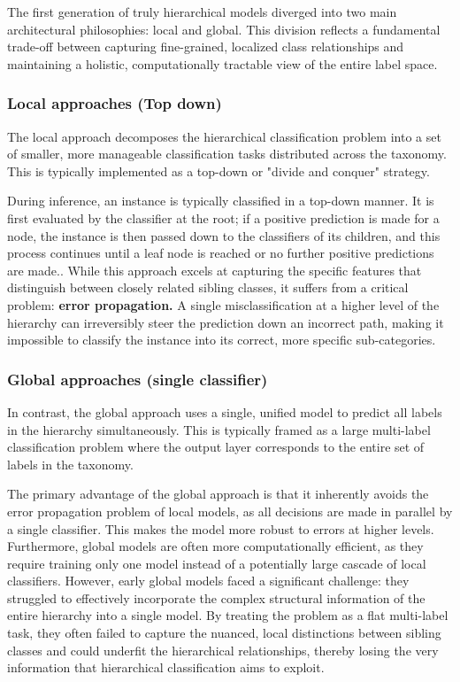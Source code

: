 The first generation of truly hierarchical models diverged into two main architectural philosophies: local and global. This division reflects a fundamental trade-off between capturing fine-grained, localized class relationships and maintaining a holistic, computationally tractable view of the entire label space.

\subsubsection{Local approaches (Top down)}
The local approach decomposes the hierarchical classification problem into a set of smaller, more manageable classification tasks distributed across the taxonomy. This is typically implemented as a top-down or "divide and conquer" strategy.

During inference, an instance is typically classified in a top-down manner. It is first evaluated by the classifier at the root; if a positive prediction is made for a node, the instance is then passed down to the classifiers of its children, and this process continues until a leaf node is reached or no further positive predictions are made.\cite{Romero2022}. While this approach excels at capturing the specific features that distinguish between closely related sibling classes, it suffers from a critical problem: \textbf{error propagation.} A single misclassification at a higher level of the hierarchy can irreversibly steer the prediction down an incorrect path, making it impossible to classify the instance into its correct, more specific sub-categories. \cite{Wehrmann2018}

\subsubsection{Global approaches (single classifier)}
In contrast, the global approach uses a single, unified model to predict all labels in the hierarchy simultaneously. This is typically framed as a large multi-label classification problem where the output layer corresponds to the entire set of labels in the taxonomy. \cite{Wehrmann2018}

The primary advantage of the global approach is that it inherently avoids the error propagation problem of local models, as all decisions are made in parallel by a single classifier. This makes the model more robust to errors at higher levels. Furthermore, global models are often more computationally efficient, as they require training only one model instead of a potentially large cascade of local classifiers. However, early global models faced a significant challenge: they struggled to effectively incorporate the complex structural information of the entire hierarchy into a single model. By treating the problem as a flat multi-label task, they often failed to capture the nuanced, local distinctions between sibling classes and could underfit the hierarchical relationships, thereby losing the very information that hierarchical classification aims to exploit. \cite{Wehrmann2018, zhou-etal-2020-hierarchy}

